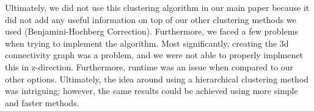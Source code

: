 \par Ultimately, we did not use this clustering algorithm in our main paper
because it did not add any useful information on top of our other clustering
methods we used (Benjamini-Hochberg Correction). Furthermore, we faced a few
problems when trying to implement the algorithm. Most significantly, creating
the 3d connectivity graph was a problem, and we were not able to properly
implmenet this in z-direction. Furthermore, runtime was an issue when compared
to our other options. Ultimately, the idea around using a hierarchical
clustering method was intriguing; however, the same results could be achieved
using more simple and faster methods.

